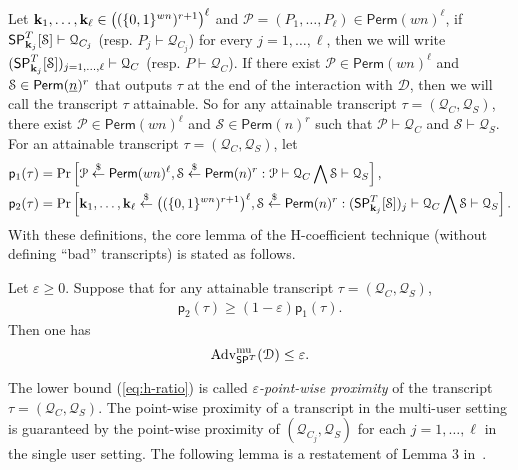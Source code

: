 \documentclass[journal=tosc,final,nohyperref]{iacrtrans}
\begin{document}
Let $\mathbf{k}_1, \ldots ,\mathbf{k}_{\ell} \in \big((\{0,1\}^{wn})^{r+1}\big)^{\ell}$ and ${\mathcal{P}} = ({P}_1, \ldots ,{P}_\ell) \in {\mathsf{Perm}}(wn)^\ell$, if $\mathsf{SP}_{\mathbf{k}_j}^T[\mathcal{S}]\vdash\mathcal{Q}_{C_j}$ (resp. ${P}_j\vdash\mathcal{Q}_{C_j}$) for every $j = 1, \ldots ,\ell$, then we will write $(\mathsf{SP}_{\mathbf{k}_j}^{T}[\mathcal{S}])_{j = 1, \ldots ,\ell} \vdash \mathcal{Q}_C$ (resp. ${P}\vdash\mathcal{Q}_{C}$).
%
If there exist ${\mathcal{P}} \in {\mathsf{Perm}}(wn)^\ell$ and $\mathcal{S} \in \mathsf{Perm}(\emph{n})^r$ that outputs $\tau$ at the end of the interaction with $\mathcal{D}$, then we will call the transcript $\tau$ attainable. So for any attainable transcript $\tau= (\mathcal{Q}_C,\mathcal{Q}_S)$, there exist ${\mathcal{P}} \in {\mathsf{Perm}}(wn)^\ell$ and $\mathcal{S} \in \mathsf{Perm}(n)^r$ such that ${\mathcal{P}}\vdash\mathcal{Q}_C$ and $\mathcal{S}\vdash\mathcal{Q}_S$. For an attainable transcript $\tau = (\mathcal{Q}_C,\mathcal{Q}_S)$, let
%
%
$$
\begin{aligned}
&\mathsf{p}_{1}(\tau)=\operatorname{Pr}\left[{\mathcal{P}} \stackrel{\$}{\leftarrow} {{\mathsf{Perm}}}(wn)^{\ell}, \mathcal{S} \stackrel{\$}{\leftarrow} \mathsf{Perm}(n)^{r}: {\mathcal{P}} \vdash \mathcal{Q}_{C} \bigwedge \mathcal{S} \vdash \mathcal{Q}_{S}\right],\\
&\mathsf{p}_{2}(\tau)=\operatorname{Pr}\left[\mathbf{k}_{1}, \ldots, \mathbf{k}_{\ell} \stackrel{\$}{\leftarrow} \big((\{0,1\}^{wn})^{r+1}\big)^{\ell}, \mathcal{S} \stackrel{\$}{\leftarrow} \mathsf{Perm}(n)^{r}:(\mathsf{SP}_{\mathbf{k}_{j}}^{T}[\mathcal{S}])_{j} \vdash \mathcal{Q}_{C} \bigwedge \mathcal{S} \vdash \mathcal{Q}_{S}\right].
\end{aligned}
$$
%
%
With these definitions, the core lemma of the H-coefficient technique (without defining ``bad'' transcripts) is stated as follows.


\begin{lemma}
	\label{lemma:h-coeff}
	
	Let $\varepsilon \geq 0$. Suppose that for any attainable transcript $\tau = (\mathcal{Q}_C,\mathcal{Q}_S)$,
	\begin{align}
	\mathsf{p}_{2}(\tau) \geq (1 - \varepsilon) \mathsf{p}_{1}(\tau).
	\label{eq:h-ratio}
	\end{align}
	Then one has
	$$
	\operatorname{Adv}^{\mathrm{mu}}_{\mathsf{SP}^T}(\mathcal{D}) \leq \varepsilon.
	$$
\end{lemma}
%
%
The lower bound (\ref{eq:h-ratio}) is called {\it $\varepsilon$-point-wise proximity} of the transcript $\tau = (\mathcal{Q}_C, \mathcal{Q}_S)$. The point-wise proximity of a transcript in the multi-user setting is guaranteed by the point-wise proximity of $(\mathcal{Q}_{C_{j}}, \mathcal{Q}_S)$ for each $j = 1, \ldots ,\ell$ in the single user setting. The following lemma is a restatement of Lemma 3 in~\cite{C:HoaTes16}.
\end{document}
